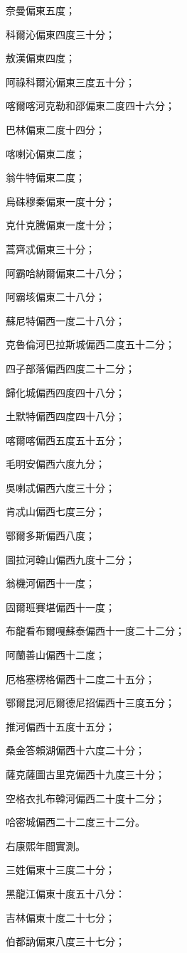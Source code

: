 \begin{pinyinscope}
奈曼偏東五度；

科爾沁偏東四度三十分；

敖漢偏東四度；

阿祿科爾沁偏東三度五十分；

喀爾喀河克勒和邵偏東二度四十六分；

巴林偏東二度十四分；

喀喇沁偏東二度；

翁牛特偏東二度；

烏硃穆秦偏東一度十分；

克什克騰偏東一度十分；

蒿齊忒偏東三十分；

阿霸哈納爾偏東二十八分；

阿霸垓偏東二十八分；

蘇尼特偏西一度二十八分；

克魯倫河巴拉斯城偏西二度五十二分；

四子部落偏西四度二十二分；

歸化城偏西四度四十八分；

土默特偏西四度四十八分；

喀爾喀偏西五度五十五分；

毛明安偏西六度九分；

吳喇忒偏西六度三十分；

肯忒山偏西七度三分；

鄂爾多斯偏西八度；

圖拉河韓山偏西九度十二分；

翁機河偏西十一度；

固爾班賽堪偏西十一度；

布龍看布爾嘎蘇泰偏西十一度二十二分；

阿蘭善山偏西十二度；

厄格塞楞格偏西十二度二十五分；

鄂爾昆河厄爾德尼招偏西十三度五分；

推河偏西十五度十五分；

桑金答賴湖偏西十六度二十分；

薩克薩圖古里克偏西十九度三十分；

空格衣扎布韓河偏西二十度十二分；

哈密城偏西二十二度三十二分。

右康熙年間實測。

三姓偏東十三度二十分；

黑龍江偏東十度五十八分：

吉林偏東十度二十七分；

伯都訥偏東八度三十七分；


\end{pinyinscope}
